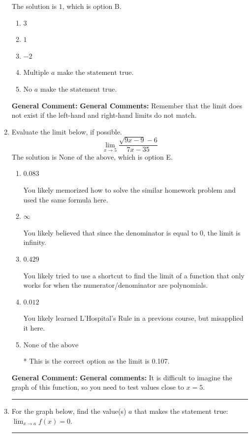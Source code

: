 \documentclass{extbook}[14pt]
\newcommand{\litem}[1]{\item #1

\rule{\textwidth}{0.4pt}}
\begin{document}
\begin{enumerate}
{The solution is \( 1 \), which is option B.\begin{enumerate}[label=\Alph*.]
\item \( 3 \)


\item \( 1 \)


\item \( -2 \)


\item \( \text{Multiple } a \text{ make the statement true}. \)


\item \( \text{No } a \text{ make the statement true}. \)


\end{enumerate}

\textbf{General Comment:} \textbf{General Comments:} Remember that the limit does not exist if the left-hand and right-hand limits do not match.
}
\litem{
Evaluate the limit below, if possible.
\[ \lim_{x \rightarrow 5} \frac{\sqrt{9x - 9} - 6}{7x - 35} \]The solution is \( \text{None of the above} \), which is option E.\begin{enumerate}[label=\Alph*.]
\item \( 0.083 \)

You likely memorized how to solve the similar homework problem and used the same formula here.
\item \( \infty \)

You likely believed that since the denominator is equal to 0, the limit is infinity.
\item \( 0.429 \)

You likely tried to use a shortcut to find the limit of a function that only works for when the numerator/denominator are polynomials.
\item \( 0.012 \)

You likely learned L'Hospital's Rule in a previous course, but misapplied it here.
\item \( \text{None of the above} \)

* This is the correct option as the limit is 0.107.
\end{enumerate}

\textbf{General Comment:} \textbf{General comments:} It is difficult to imagine the graph of this function, so you need to test values close to $x = 5$.
}
\litem{
For the graph below, find the value(s) $a$ that makes the statement true: $ \displaystyle \lim_{x \rightarrow a} f(x) = 0$.

}
\end{enumerate}
\end{document}
